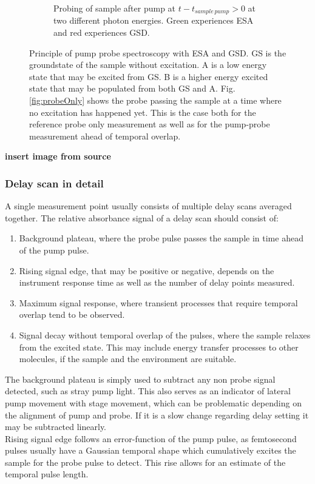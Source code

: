 \documentclass[twoside,openright]{scrreprt}
\begin{document}
\begin{figure}[hbtp]
\begin{subfigure}[t]{0.3\textwidth}
\caption{Probing of sample  after pump at $t-t_{sample\, pump} > 0$ at two different photon energies. Green experiences ESA and red experiences GSD.\label{fig:probeAfterPump}}
\end{subfigure}
\caption{Principle of pump probe spectroscopy with ESA and GSD. GS is the groundstate of the sample without excitation. A is a low energy state that may be excited from GS. B is a higher energy excited state that may be populated from both GS and A. Fig. \ref{fig:probeOnly} shows the probe passing the sample at a time where no excitation has happened yet. This is the case both for the reference probe only measurement as well as for the pump-probe measurement ahead of temporal overlap.\label{fig:CompendiumTA}}
\end{figure}


\textbf{insert image from source}
\subsubsection{Delay scan in detail}
A single measurement point usually consists of multiple delay scans averaged together. The relative absorbance signal of a delay scan should consist of:
\begin{enumerate}
\item Background plateau, where the probe pulse passes the sample in time ahead of the pump pulse.
\item Rising signal edge, that may be positive or negative, depends on the instrument response time as well as the number of delay points measured.
\item Maximum signal response, where transient processes that require temporal overlap tend to be observed.
\item Signal decay without temporal overlap of the pulses, where the sample relaxes from the excited state. This may include energy transfer processes to other molecules, if the sample and the environment are suitable.
\end{enumerate}
The background plateau is simply used to subtract any non probe signal detected, such as stray pump light. This also serves as an indicator of lateral pump movement with stage movement, which can be problematic depending on the alignment of pump and probe. If it is a slow change regarding delay setting it may be subtracted linearly.\\
Rising signal edge follows an error-function of the pump pulse, as femtosecond pulses usually have a Gaussian temporal shape which cumulatively excites the sample for the probe pulse to detect. This rise allows for an estimate of the temporal pulse length.
\end{document}
